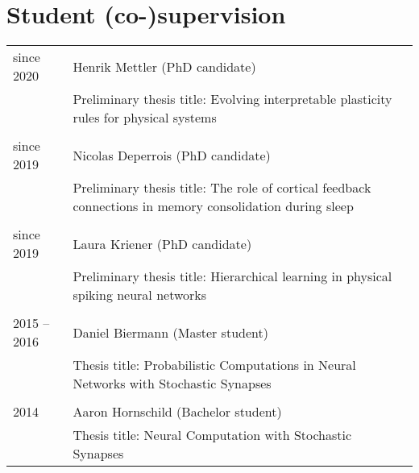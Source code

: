 \section{Student (co-)supervision}

\begin{longtable}{>{\hfill}p{3.3cm}|p{12.0cm}}
  since 2020 & Henrik Mettler (PhD candidate) \\
  & \footnotesize  Preliminary thesis title: Evolving interpretable plasticity rules for physical systems \\
  \multicolumn{2}{c}{} \\
  since 2019 & Nicolas Deperrois (PhD candidate) \\
  & \footnotesize  Preliminary thesis title: The role of cortical feedback connections in memory consolidation during sleep \\
  \multicolumn{2}{c}{} \\
  since 2019 & Laura Kriener (PhD candidate) \\
  & \footnotesize  Preliminary thesis title: Hierarchical learning in physical spiking neural networks \\
  \multicolumn{2}{c}{} \\
  2015 -- 2016 & Daniel Biermann (Master student) \\
  & \footnotesize  Thesis title: Probabilistic Computations in Neural Networks with Stochastic Synapses \\
  \multicolumn{2}{c}{} \\
  2014 & Aaron Hornschild (Bachelor student) \\
  & \footnotesize Thesis title: Neural Computation with Stochastic Synapses \\
\end{longtable}